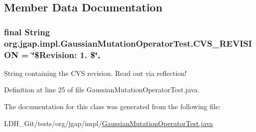 \subsection{Member Data Documentation}
\hypertarget{classorg_1_1jgap_1_1impl_1_1_gaussian_mutation_operator_test_a68baef2c42e5e22799b793ef9e3751cf}{
\subsubsection[{C\-V\-S\-\_\-\-R\-E\-V\-I\-S\-I\-O\-N}]{\setlength{\rightskip}{0pt plus 5cm}final String org.\-jgap.\-impl.\-Gaussian\-Mutation\-Operator\-Test.\-C\-V\-S\-\_\-\-R\-E\-V\-I\-S\-I\-O\-N = \char`\"{}\$Revision\-: 1. \$\char`\"{}\hspace{0.3cm}{\ttfamily [static]}, {\ttfamily [private]}}}\label{classorg_1_1jgap_1_1impl_1_1_gaussian_mutation_operator_test_a68baef2c42e5e22799b793ef9e3751cf}
String containing the C\-V\-S revision. Read out via reflection! 

Definition at line 25 of file Gaussian\-Mutation\-Operator\-Test.\-java.



The documentation for this class was generated from the following file\-:\begin{DoxyCompactItemize}
\item 
L\-D\-H\-\_\-\-Git/tests/org/jgap/impl/\hyperlink{_gaussian_mutation_operator_test_8java}{Gaussian\-Mutation\-Operator\-Test.\-java}\end{DoxyCompactItemize}
